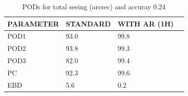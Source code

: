 \begin{table}[]
\begin{center}
\begin{tabular}{|l|l|l|l|}
\hline
\multicolumn{1}{|c|}{\cellcolor[HTML]{C0C0C0}\textbf{PARAMETER}} & \multicolumn{1}{c|}{\cellcolor[HTML]{C0C0C0}\textbf{STANDARD}} & \multicolumn{1}{c|}{\cellcolor[HTML]{C0C0C0}\textbf{WITH AR (1H)}} \\
\hline
\cellcolor[HTML]{C0C0C0}POD1  & 93.0                                & 99.8         \\
\cellcolor[HTML]{C0C0C0}POD2  & 93.8                                & 99.3         \\
\cellcolor[HTML]{C0C0C0}POD3  & 82.0                                & 99.4         \\
\cellcolor[HTML]{C0C0C0}PC    & 92.3                                  & 99.6           \\
\cellcolor[HTML]{C0C0C0}EBD   & 5.6                                 & 0.2          \\
\hline
\end{tabular}
\caption{PODs for total seeing (arcsec) and accuray 0.24}
\end{center}
\end{table}
